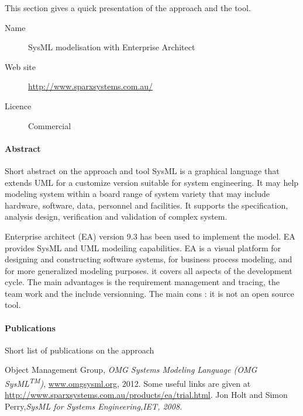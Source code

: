 This section gives a quick presentation of the approach and the tool.

\begin{description}
\item[Name] SysML modelisation with Enterprise Architect
\item[Web site] \url{http://www.sparxsystems.com.au/}
\item[Licence] Commercial
\end{description}

\paragraph{Abstract} Short abstract on the approach and tool 
SysML \cite{SysML} is a graphical language that extends UML for a customize
version suitable for system engineering. It may help modeling system within a board range of
system variety that may include hardware, software, data, personnel and facilities. It supports the
specification, analysis design, verification and validation of complex system.

Enterprise architect (EA) version 9.3 \cite{website} has been used to implement
the model. EA provides SysML and UML modeiling capabilities.
EA is a visual platform for designing and constructing
software systems, for business process modeling, and for more generalized modeling purposes. it
covers all aspects of the development cycle. The main advantages is the requirement management
and tracing, the team work and the include versionning. The main cons : it is not an open source
tool.



\paragraph{Publications} Short list of publications on the approach 
\begingroup
\renewcommand{\chapter}[2]{}%
\renewcommand{\bibname}{}
\begin{thebibliography}{5}

Object Management Group,  {\it OMG Systems Modeling Language (OMG
SysML\textsuperscript{TM})}, \url{www.omgsysml.org}, 2012.
Some useful links are given at \url{http://www.sparxsystems.com.au/products/ea/trial.html}.
 Jon Holt and Simon Perry,\it{SysML for Systems
    Engineering},IET, 2008.
 
\end{thebibliography}
\endgroup



